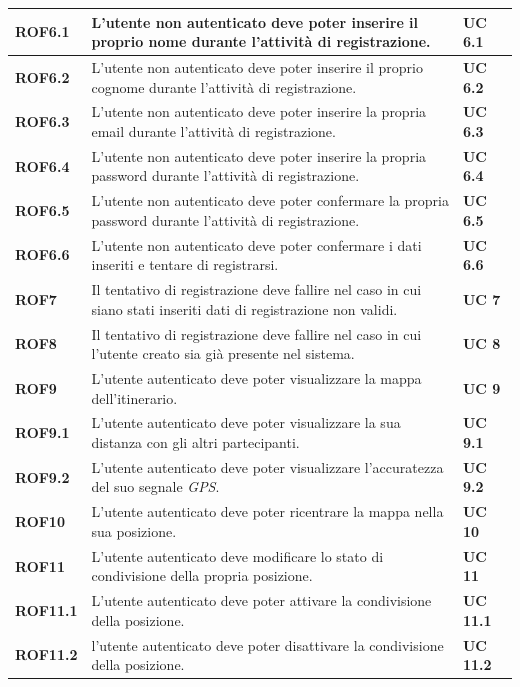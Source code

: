 \begin{longtable}{ |p{2cm}|p{8cm}|p{2cm}|  }
    \textbf{ROF6.1} & L'utente non autenticato deve poter inserire il proprio nome durante l'attività di registrazione. & \textbf{UC 6.1} \\ \hline
    \textbf{ROF6.2} & L'utente non autenticato deve poter inserire il proprio cognome durante l'attività di registrazione. & \textbf{UC 6.2} \\ \hline
    \textbf{ROF6.3} & L'utente non autenticato deve poter inserire la propria email durante l'attività di registrazione. & \textbf{UC 6.3} \\ \hline
    \textbf{ROF6.4} & L'utente non autenticato deve poter inserire la propria password durante l'attività di registrazione. & \textbf{UC 6.4} \\ \hline
    \textbf{ROF6.5} & L'utente non autenticato deve poter confermare la propria password durante l'attività di registrazione. & \textbf{UC 6.5} \\ \hline
    \textbf{ROF6.6} & L'utente non autenticato deve poter confermare i dati inseriti e tentare di registrarsi. & \textbf{UC 6.6} \\ \hline
    \textbf{ROF7}   & Il tentativo di registrazione deve fallire nel caso in cui siano stati inseriti dati di registrazione non validi. & \textbf{UC 7}   \\ \hline
    \textbf{ROF8}   & Il tentativo di registrazione deve fallire nel caso in cui l'utente creato sia già presente nel sistema. & \textbf{UC 8}   \\ \hline
    \textbf{ROF9}   & L'utente autenticato deve poter visualizzare la mappa dell'itinerario. & \textbf{UC 9}   \\ \hline
    \textbf{ROF9.1} & L'utente autenticato deve poter visualizzare la sua distanza con gli altri partecipanti. & \textbf{UC 9.1} \\ \hline
    \textbf{ROF9.2} & L'utente autenticato deve poter visualizzare l'accuratezza del suo segnale \textit{GPS}. & \textbf{UC 9.2} \\ \hline
    \textbf{ROF10}  & L'utente autenticato deve poter ricentrare la mappa nella sua posizione. & \textbf{UC 10}  \\ \hline
    \textbf{ROF11}  & L'utente autenticato deve modificare lo stato di condivisione della propria posizione. & \textbf{UC 11}  \\ \hline
    \textbf{ROF11.1} & L'utente autenticato deve poter attivare la condivisione della posizione. & \textbf{UC 11.1} \\ \hline
    \textbf{ROF11.2} & l'utente autenticato deve poter disattivare la condivisione della posizione. & \textbf{UC 11.2} \\ \hline

\end{longtable}
